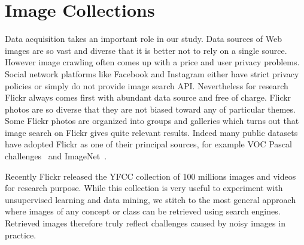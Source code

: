 \documentclass[preprint,12pt]{elsarticle}
\begin{document}

\section{Image Collections}\label{sec:datacollection}
\noindent Data acquisition takes an important role in our study. Data sources of Web images are so vast and diverse that it is better not to rely on a single source. However image crawling often comes up with a price and user privacy problems. Social network platforms like Facebook and Instagram either have strict privacy policies or simply do not provide image search API. Nevertheless for research Flickr always comes first with abundant data source and free of charge. Flickr photos are so diverse that they are not biased toward any of particular themes. Some Flickr photos are organized into groups and galleries which turns out that image search on Flickr gives quite relevant results. Indeed many public datasets have adopted Flickr as one of their principal sources, for example VOC Pascal challenges~\cite{Everingham10} and ImageNet~\cite{ILSVRC15}. 

Recently Flickr released the YFCC collection of 100 millions images and videos for research purpose. While this collection is very useful to experiment with unsupervised learning and data mining, we stitch to the most general approach where images of any concept or class can be retrieved using search engines. Retrieved images therefore truly reflect challenges caused by noisy images in practice. 
\end{document}
